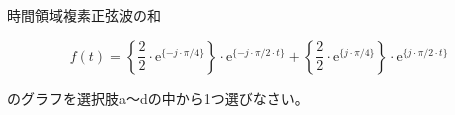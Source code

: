 時間領域複素正弦波の和

\[
f(t) =
\left \{ \frac{2}{2} \cdot \textrm{e}^{\{-j \cdot \pi/4 \}} \right \} \cdot \textrm{e}^{\{-j \cdot \pi/2 \cdot t \}}
+  \left \{ \frac{2}{2} \cdot \textrm{e}^{\{j  \cdot \pi/4 \}} \right \} \cdot \textrm{e}^{\{j \cdot \pi/2 \cdot t \}}
\]

\bigskip
\noindent  のグラフを選択肢a〜dの中から1つ選びなさい。
